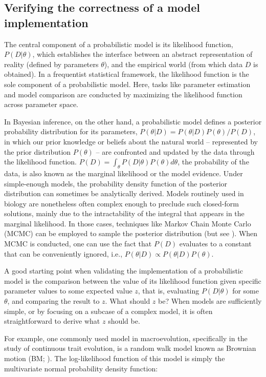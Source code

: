 \documentclass[oneside]{article}
\begin{document}
\subsection*{Verifying the correctness of a model implementation}

The central component of a probabilistic model is its likelihood
function, $P(D|\theta)$, which establishes the
interface between an abstract representation of reality (defined by parameters $\theta$), and the
empirical world (from which data $D$ is obtained).
In a frequentist statistical framework, the likelihood function is the sole
component of a probabilistic model.
Here, tasks like parameter estimation and model comparison are conducted
by maximizing the likelihood function across parameter
space.

In Bayesian inference, on the other hand, a probabilistic model
defines a posterior probability distribution for its parameters,
$P(\theta|D) = P(\theta|D)P(\theta) / P(D)$, in which our prior
knowledge or beliefs about the natural world -- represented by the prior
distribution $P(\theta)$ -- are confronted and updated by the data through the
likelihood function.
$P(D) = \int_\theta P(D|\theta)P(\theta)d\theta$, the probability of
the data, is also known as the marginal likelihood or the model evidence.
Under simple-enough models, the probability density function of the posterior distribution can sometimes be analytically
derived.
Models routinely used in biology are nonetheless often complex enough
to preclude such closed-form solutions, mainly due to the
intractability of the integral that appears in the marginal
likelihood.
In those cases, techniques like Markov Chain Monte Carlo (MCMC) can be employed to
sample the posterior distribution (but see \citealt{zhang18}).
When MCMC is conducted, one can use the fact that $P(D)$
evaluates to a constant that can be conveniently ignored, i.e., $P(\theta|D) \propto P(\theta|D)P(\theta)$.

A good starting point when validating the implementation of a probabilistic
model is the comparison between the value of its likelihood function given
specific parameter values to some expected value $z$, that
is, evaluating $P(D|\theta)$ for some $\theta$, and comparing the
result to $z$.
What should $z$ be? When models are sufficiently simple, or by focusing
on a subcase of a complex model, it is often straightforward to derive
what $z$ should be.

For example, one commonly used model in macroevolution, specifically in the study
of continuous trait evolution, is a random walk model known as
Brownian motion (BM; \citealt{felsenstein73}).
The log-likelihood function of this model is simply the multivariate
normal probability density function:
\end{document}
